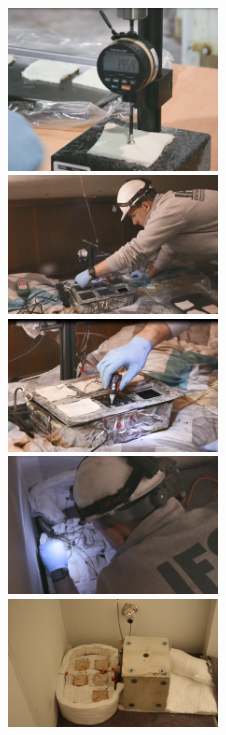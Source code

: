 \documentclass[12pt,oneside]{book}
\begin{document}
\begin{figure}[H]
\centering
\includegraphics[width=0.495\textwidth]{../0_Images/Instrumentation/Burn_Measurements/SBA_Measurment}
\includegraphics[width=0.495\textwidth]{../0_Images/Instrumentation/Burn_Measurements/SBA_Sub_TC_Attach}
\includegraphics[width=0.495\textwidth]{../0_Images/Instrumentation/Burn_Measurements/SBA_gluing}
\includegraphics[width=0.495\textwidth]{../0_Images/Instrumentation/Burn_Measurements/SBA_Sur_TC_Attach}
\includegraphics[width=0.495\textwidth]{../0_Images/Instrumentation/Burn_Measurements/SBA_Deployed}

\end{figure}
\end{document}
